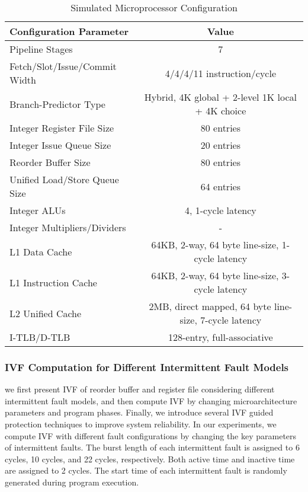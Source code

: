 \begin{table} 
    \centering
    \caption{Simulated Microprocessor Configuration}
    \setlength{\tabcolsep}{4mm}
    \begin{tabular}{@{}lc@{}}
        \toprule
        Configuration Parameter & Value \\ \midrule
        Pipeline Stages & 7 \\
        Fetch/Slot/Issue/Commit Width & 4/4/4/11 instruction/cycle \\
        Branch-Predictor Type & Hybrid, 4K global + 2-level 1K local + 4K choice \\
        Integer Register File Size & 80 entries  \\
        Integer Issue Queue Size & 20 entries \\
        Reorder Buffer Size & 80 entries \\
        Unified Load/Store Queue Size & 64 entries \\
        Integer ALUs & 4, 1-cycle latency \\
        Integer Multipliers/Dividers &  - \\
        L1 Data Cache & 64KB, 2-way, 64 byte line-size, 1-cycle latency \\
        L1 Instruction Cache & 64KB, 2-way, 64 byte line-size, 3-cycle latency \\
        L2 Unified Cache & 2MB, direct mapped, 64 byte line-size, 7-cycle latency \\
        I-TLB/D-TLB & 128-entry, full-associative \\ \bottomrule
    \end{tabular}
    \label{tab:sim-config}
\end{table}

\subsubsection{IVF Computation for Different Intermittent Fault Models}
we first present IVF of reorder buffer and register file considering different intermittent fault models, and then compute IVF by changing microarchitecture parameters and program phases. Finally, we introduce several IVF guided protection techniques to improve system reliability. In our experiments, we compute IVF with different fault configurations by changing the key parameters of intermittent faults. The burst length of each intermittent fault is assigned to 6 cycles, 10 cycles, and 22 cycles, respectively. Both active time and inactive time are assigned to 2 cycles. The start time of each intermittent fault is randomly generated during program execution.

